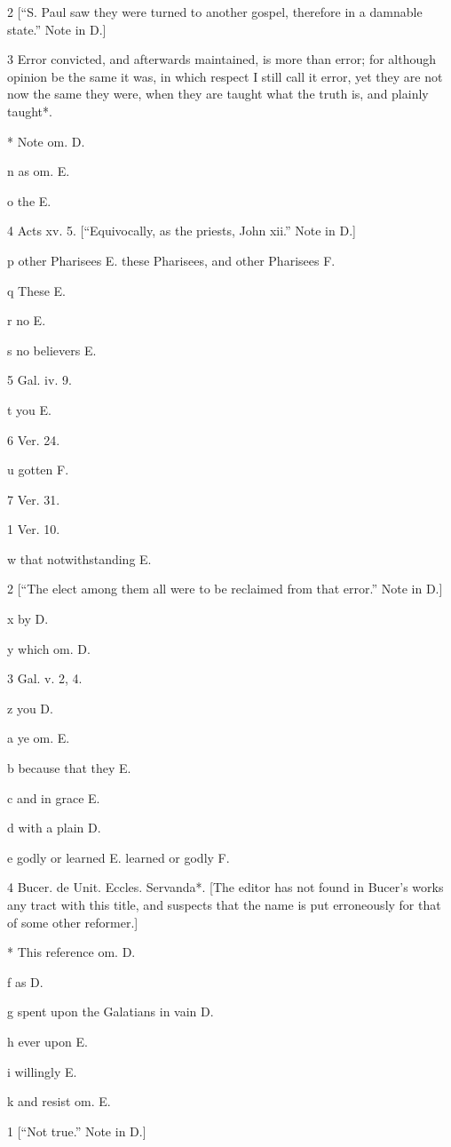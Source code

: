 2
[“S. Paul saw they were turned to another gospel, therefore in a damnable state.” Note in D.]

3
Error convicted, and afterwards maintained, is more than error; for although opinion be the same it was, in which respect I still call it error, yet they are not now the same they were, when they are taught what the truth is, and plainly taught*.

*
Note om. D.

n
as om. E.

o
the E.

4
Acts xv. 5. [“Equivocally, as the priests, John xii.” Note in D.]

p
other Pharisees E. these Pharisees, and other Pharisees F.

q
These E.

r
no E.

s
no believers E.

5
Gal. iv. 9.

t
you E.

6
Ver. 24.

u
gotten F.

7
Ver. 31.

1
Ver. 10.

w
that notwithstanding E.

2
[“The elect among them all were to be reclaimed from that error.” Note in D.]

x
by D.

y
which om. D.

3
Gal. v. 2, 4.

z
you D.

a
ye om. E.

b
because that they E.

c
and in grace E.

d
with a plain D.

e
godly or learned E. learned or godly F.

4
Bucer. de Unit. Eccles. Servanda*. [The editor has not found in Bucer’s works any tract with this title, and suspects that the name is put erroneously for that of some other reformer.]

*
This reference om. D.

f
as D.

g
spent upon the Galatians in vain D.

h
ever upon E.

i
willingly E.

k
and resist om. E.

1
[“Not true.” Note in D.]

